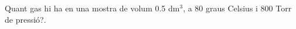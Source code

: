 \begin{exr}
Quant gas hi ha en una mostra de volum 0.5 dm$^3$, a 80 graus Celsius i 800 Torr de pressió?.
\end{exr}
